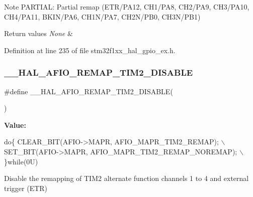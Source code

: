 \begin{DoxyNote}{Note}
P\+A\+R\+T\+I\+AL\+: Partial remap (E\+T\+R/\+P\+A12, C\+H1/\+P\+A8, C\+H2/\+P\+A9, C\+H3/\+P\+A10, C\+H4/\+P\+A11, B\+K\+I\+N/\+P\+A6, C\+H1\+N/\+P\+A7, C\+H2\+N/\+P\+B0, C\+H3\+N/\+P\+B1) 
\end{DoxyNote}

\begin{DoxyRetVals}{Return values}
{\em None} & \\
\hline
\end{DoxyRetVals}


Definition at line 235 of file stm32f1xx\+\_\+hal\+\_\+gpio\+\_\+ex.\+h.

\mbox{\label{group___g_p_i_o_ex___a_f_i_o___a_f___r_e_m_a_p_p_i_n_g_ga8bf8cf84fc099076c3ec6d7d31dd8abc}} 
\subsubsection{\texorpdfstring{\+\_\+\+\_\+\+H\+A\+L\+\_\+\+A\+F\+I\+O\+\_\+\+R\+E\+M\+A\+P\+\_\+\+T\+I\+M2\+\_\+\+D\+I\+S\+A\+B\+LE}{\_\_HAL\_AFIO\_REMAP\_TIM2\_DISABLE}}
{\footnotesize\ttfamily \#define \+\_\+\+\_\+\+H\+A\+L\+\_\+\+A\+F\+I\+O\+\_\+\+R\+E\+M\+A\+P\+\_\+\+T\+I\+M2\+\_\+\+D\+I\+S\+A\+B\+LE(\begin{DoxyParamCaption}{ }\end{DoxyParamCaption})}

{\bfseries Value\+:}
\begin{DoxyCode}
\textcolor{keywordflow}{do}\{ CLEAR\_BIT(AFIO->MAPR, AFIO\_MAPR\_TIM2\_REMAP);         \(\backslash\)
                                            SET\_BIT(AFIO->MAPR, AFIO\_MAPR\_TIM2\_REMAP\_NOREMAP);   \(\backslash\)
                                          \}\textcolor{keywordflow}{while}(0U)
\end{DoxyCode}


Disable the remapping of T\+I\+M2 alternate function channels 1 to 4 and external trigger (E\+TR) 


